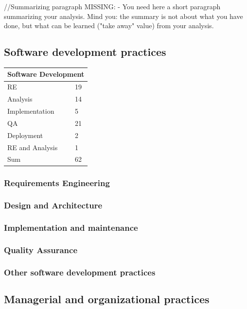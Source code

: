 \documentclass[final,5p,times,twocolumn]{elsarticle}
\begin{document}
//Summarizing paragraph  MISSING: - You need here a short paragraph summarizing your analysis. Mind you: the summary is not about what you have done, but what can be learned ("take away" value) from your analysis.


\subsection{Software development practices}




\begin{center}
\begin{tabular}{|l|l|}
\hline
\multicolumn{2}{|c|}{\textbf{Software Development}} \\
\hline
RE & 19 \\
Analysis & 14 \\
Implementation & 5 \\
QA & 21 \\
Deployment & 2 \\
RE and Analysis & 1 \\
\hline
Sum & 62 \\
\hline
\end{tabular}
\end{center}





\label{sub:analysis-software-dev}
\subsubsection{Requirements Engineering}
\subsubsection{Design and Architecture}
\subsubsection{Implementation and maintenance}
\subsubsection{Quality Assurance}
\subsubsection{Other software development practices}



\subsection{Managerial and organizational practices}
\end{document}
